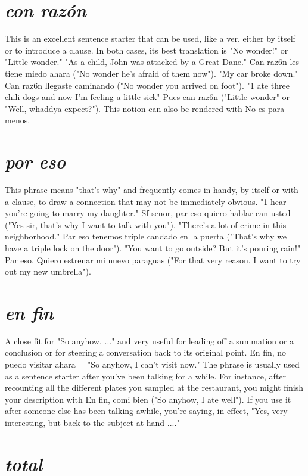 \section{\emph{con razón}}

This is an excellent sentence starter that can be used, like
a ver, either by itself or to introduce a clause. In both cases, its best
translation is "No wonder!" or "Little wonder." "As a child, John was
attacked by a Great Dane." Can raz6n les tiene miedo ahara ("No
wonder he's afraid of them now"). "My car broke down." Can raz6n
llegaste caminando ("No wonder you arrived on foot"). "1 ate three
chili dogs and now I'm feeling a little sick" Pues can raz6n ("Little
wonder" or "Well, whaddya expect?"). This notion can also be rendered
with No es para menos.

\section{\emph{por eso}}

This phrase means "that's why" and frequently comes in
handy, by itself or with a clause, to draw a connection that may not be
immediately obvious. "1 hear you're going to marry my daughter." Sf
senor, par eso quiero hablar can usted ("Yes sir, that's why I want to
talk with you"). "There's a lot of crime in this neighborhood." Par eso
tenemos triple candado en la puerta ("That's why we have a triple
lock on the door"). "You want to go outside? But it's pouring rain!" Par
eso. Quiero estrenar mi nuevo paraguas ("For that very reason. I want
to try out my new umbrella").

\section{\emph{en fin}}

A close fit for "So anyhow, ..." and very useful for leading off
a summation or a conclusion or for steering a conversation back to its
original point. En fin, no puedo visitar ahara = "So anyhow, I can't
visit now." The phrase is usually used as a sentence starter after you've
been talking for a while. For instance, after recounting all the different
plates you sampled at the restaurant, you might finish your description
with En fin, comi bien ("So anyhow, I ate well"). If you use it after
someone else has been talking awhile, you're saying, in effect, "Yes,
very interesting, but back to the subject at hand ...."

\section{\emph{total}}

